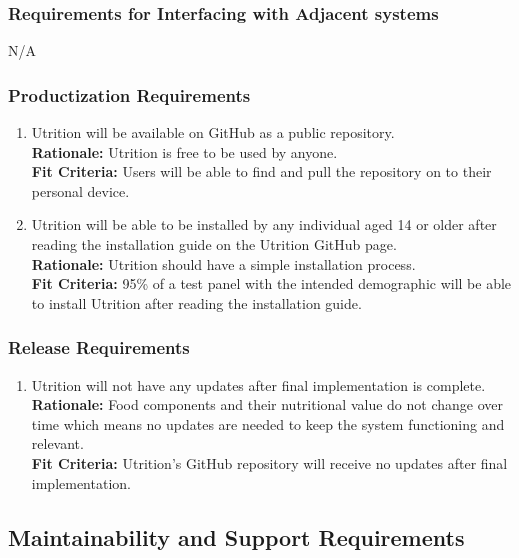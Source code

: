 \documentclass[12pt]{article}
\begin{document}
\subsubsection{Requirements for Interfacing with Adjacent systems}
\hspace{1.5cm}N/A 

\subsubsection{Productization Requirements}
\begin{enumerate}[start=1,label={OE\arabic*.}]
	\item Utrition will be available on GitHub as a public repository.\\
	\textbf{Rationale:} Utrition is free to be used by anyone.\\
	\textbf{Fit Criteria:} Users will be able to find and pull the repository on to their personal device.
	\item Utrition will be able to be installed by any individual aged 14 or older after reading the installation guide on the Utrition GitHub page.\\
	\textbf{Rationale:} Utrition should have a simple installation process. \\
	\textbf{Fit Criteria:} 95\% of a test panel with the intended demographic will be able to install Utrition after reading the installation guide.
\end{enumerate}

\subsubsection{Release Requirements}

\begin{enumerate}[{OE}3. ] 
	\item Utrition will not have any updates after final implementation is complete.\\
	\textbf{Rationale:} Food components and their nutritional value do not change over time which means no updates are needed to keep the system functioning and relevant.\\	
	\textbf{Fit Criteria:} Utrition’s GitHub repository will receive no updates after final implementation.
\end{enumerate}

\subsection{Maintainability and Support Requirements}
\end{document}

